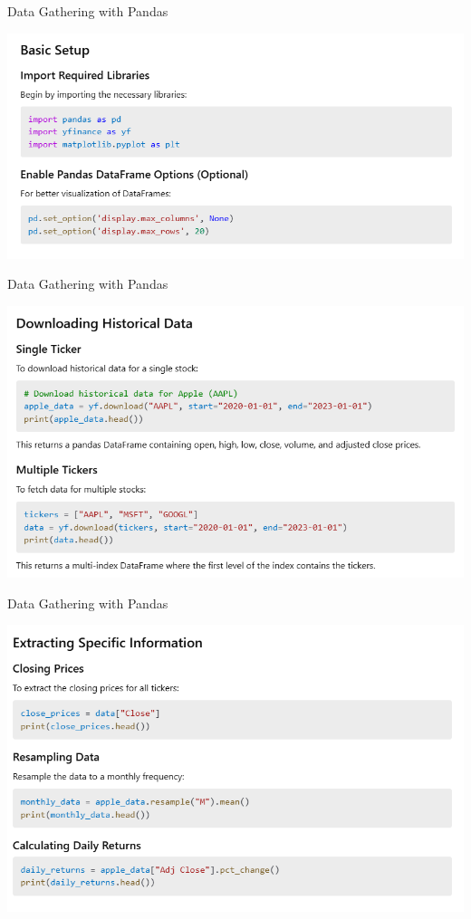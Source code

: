 \documentclass[11pt]{beamer}
\begin{document}
\begin{frame}{Data Gathering with Pandas}
	\begin{center}
	\includegraphics[scale=0.55]{../05-pictures/lesson-1-3_pic_14.png}
	\end{center}
\end{frame}
\begin{frame}{Data Gathering with Pandas}
	\begin{center}
	\includegraphics[scale=0.55]{../05-pictures/lesson-1-3_pic_15.png}
	\end{center}
\end{frame}
\begin{frame}{Data Gathering with Pandas}
	\begin{center}
	\includegraphics[scale=0.55]{../05-pictures/lesson-1-3_pic_16.png}
	\end{center}
\end{frame}
\end{document}
